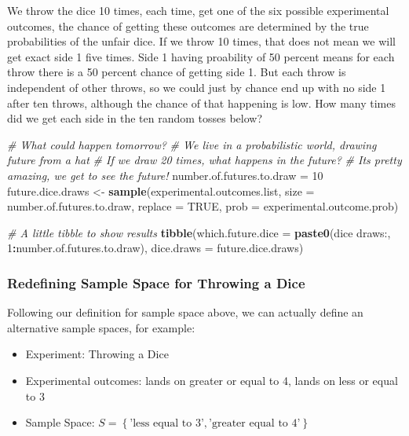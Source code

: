 \documentclass[
]{book}
\newenvironment{Shaded}{\begin{snugshade}}{\end{snugshade}}
\newcommand{\CommentTok}[1]{\textcolor[rgb]{0.56,0.35,0.01}{\textit{#1}}}
\newcommand{\DataTypeTok}[1]{\textcolor[rgb]{0.13,0.29,0.53}{#1}}
\newcommand{\DecValTok}[1]{\textcolor[rgb]{0.00,0.00,0.81}{#1}}
\newcommand{\KeywordTok}[1]{\textcolor[rgb]{0.13,0.29,0.53}{\textbf{#1}}}
\newcommand{\NormalTok}[1]{#1}
\newcommand{\OperatorTok}[1]{\textcolor[rgb]{0.81,0.36,0.00}{\textbf{#1}}}
\newcommand{\OtherTok}[1]{\textcolor[rgb]{0.56,0.35,0.01}{#1}}
\newcommand{\StringTok}[1]{\textcolor[rgb]{0.31,0.60,0.02}{#1}}
\providecommand{\tightlist}{%
  \setlength{\itemsep}{0pt}\setlength{\parskip}{0pt}}
\begin{document}
We throw the dice 10 times, each time, get one of the six possible experimental outcomes, the chance of getting these outcomes are determined by the true probabilities of the unfair dice. If we throw 10 times, that does not mean we will get exact side 1 five times. Side 1 having proability of 50 percent means for each throw there is a 50 percent chance of getting side 1. But each throw is independent of other throws, so we could just by chance end up with no side 1 after ten throws, although the chance of that happening is low. How many times did we get each side in the ten random tosses below?

\begin{Shaded}
\begin{Highlighting}[]
\CommentTok{\# What could happen tomorrow?}
\CommentTok{\# We live in a probabilistic world, drawing future from a hat}
\CommentTok{\# If we draw 20 times, what happens in the future?}
\CommentTok{\# It\textquotesingle{}s pretty amazing, we get to see the future!}
\NormalTok{number.of.futures.to.draw =}\StringTok{ }\DecValTok{10}
\NormalTok{future.dice.draws \textless{}{-}}\StringTok{ }\KeywordTok{sample}\NormalTok{(experimental.outcomes.list,}
                            \DataTypeTok{size =}\NormalTok{ number.of.futures.to.draw,}
                            \DataTypeTok{replace =} \OtherTok{TRUE}\NormalTok{,}
                            \DataTypeTok{prob =}\NormalTok{ experimental.outcome.prob)}

\CommentTok{\# A little tibble to show results}
\KeywordTok{tibble}\NormalTok{(}\DataTypeTok{which.future.dice =} \KeywordTok{paste0}\NormalTok{(}\StringTok{\textquotesingle{}dice draws:\textquotesingle{}}\NormalTok{, }\DecValTok{1}\OperatorTok{:}\NormalTok{number.of.futures.to.draw),}
       \DataTypeTok{dice.draws =}\NormalTok{ future.dice.draws)}
\end{Highlighting}
\end{Shaded}

\hypertarget{redefining-sample-space-for-throwing-a-dice}{%
\subsubsection{Redefining Sample Space for Throwing a Dice}\label{redefining-sample-space-for-throwing-a-dice}}

Following our definition for sample space above, we can actually define an alternative sample spaces, for example:

\begin{itemize}
\tightlist
\item
  Experiment: Throwing a Dice
\item
  Experimental outcomes: lands on greater or equal to 4, lands on less or equal to 3
\item
  Sample Space: \(S=\left\{\text{'less equal to 3'}, \text{'greater equal to 4'}\right\}\)
\end{itemize}
\end{document}
